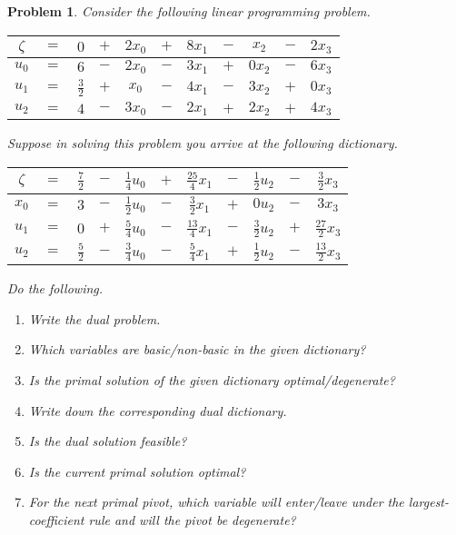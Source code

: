\documentclass[12pt,oneside]{amsart}
\numberwithin{equation}{section}
\numberwithin{figure}{section}
\theoremstyle{plain}
\newtheorem{prob}{Problem}
\theoremstyle{definition}
\begin{document}
\begin{prob}
Consider the following linear programming problem. \\
\begin{center}\begin{tabular}{|ccccccccccc|}
\hline
$\zeta$ & $=$ & $0$           & $+$ & $2x_0$ & $+$ & $8x_1$ & $-$ & $x_2$  & $-$ & $2x_3$ \\
\hline
$u_0$   & $=$ & $6$           & $-$ & $2x_0$ & $-$ & $3x_1$ & $+$ & $0x_2$ & $-$ & $6x_3$ \\
$u_1$   & $=$ & $\frac{3}{2}$ & $+$ & $x_0$  & $-$ & $4x_1$ & $-$ & $3x_2$ & $+$ & $0x_3$ \\
$u_2$   & $=$ & $4$           & $-$ & $3x_0$ & $-$ & $2x_1$ & $+$ & $2x_2$ & $+$ & $4x_3$ \\
\hline
\end{tabular}\end{center}
Suppose in solving this problem you arrive at the following dictionary. \\
\begin{center}\begin{tabular}{|ccccccccccc|}
\hline
$\zeta$ & $=$ & $\frac{7}{2}$ & $-$ & $\frac{1}{4}u_0$ & $+$ & $\frac{25}{4}x_1$ & $-$ & $\frac{1}{2}u_2$ & $-$ & $\frac{3}{2}x_3$  \\
\hline
$x_0$   & $=$ & $3$           & $-$ & $\frac{1}{2}u_0$ & $-$ & $\frac{3}{2}x_1$  & $+$ & $0u_2$           & $-$ & $3x_3$            \\
$u_1$   & $=$ & $0$           & $+$ & $\frac{5}{4}u_0$ & $-$ & $\frac{13}{4}x_1$ & $-$ & $\frac{3}{2}u_2$ & $+$ & $\frac{27}{2}x_3$ \\
$u_2$   & $=$ & $\frac{5}{2}$ & $-$ & $\frac{3}{4}u_0$ & $-$ & $\frac{5}{4}x_1$  & $+$ & $\frac{1}{2}u_2$ & $-$ & $\frac{13}{2}x_3$ \\
\hline
\end{tabular}\end{center}
Do the following.
\begin{enumerate}
  \item Write the dual problem.
  \item Which variables are basic/non-basic in the given dictionary?
  \item Is the primal solution of the given dictionary optimal/degenerate?
  \item Write down the corresponding dual dictionary.
  \item Is the dual solution feasible?
  \item Is the current primal solution optimal?
  \item For the next primal pivot, which variable will enter/leave under the largest-coefficient 
    rule and will the pivot be degenerate?
\end{enumerate}
\end{prob}
\end{document}
